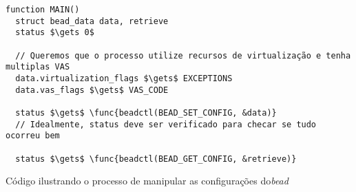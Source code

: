 \begin{pseudocode}

\begin{lstlisting}[language=pseudocode, style=pseudocode]
function MAIN()
  struct bead_data data, retrieve
  status $\gets 0$

  // Queremos que o processo utilize recursos de virtualização e tenha multiplas VAS
  data.virtualization_flags $\gets$ EXCEPTIONS
  data.vas_flags $\gets$ VAS_CODE

  status $\gets$ \func{beadctl(BEAD_SET_CONFIG, &data)}
  // Idealmente, status deve ser verificado para checar se tudo ocorreu bem

  status $\gets$ \func{beadctl(BEAD_GET_CONFIG, &retrieve)}

\end{lstlisting}

  \caption{Código ilustrando o processo de manipular as configurações  do\emph{bead}}
  \label{alg:exconfig}
\end{pseudocode}
